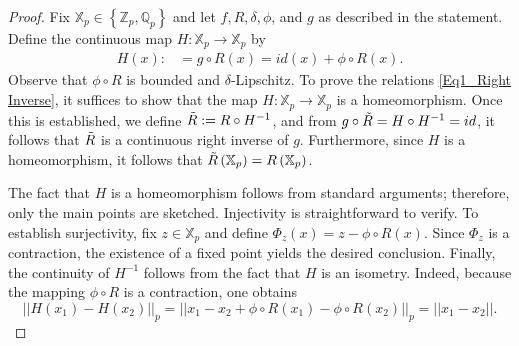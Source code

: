 \documentclass[a4paper, 12pt]{article}
\theoremstyle{definition}
\begin{document}
	
	\begin{proof} 
		Fix $\mathbb{X}_{p} \in  \left\{  \mathbb{Z}_{p}, \mathbb{Q}_{p}  \right\} $ and let $f, R, \delta, \phi$, and $g$ as described in the statement. Define the continuous map $H: \mathbb{X}_{p} \to \mathbb{X}_{p}$ by 
		\begin{align*} 
			H(x) : &=   g\circ R(x)    =   id(x) + \phi \circ R(x)   .
		\end{align*}
		Observe that $\phi\circ R$ is bounded and $\delta$-Lipschitz. To prove the relations \eqref{Eq1_Right Inverse}, it suffices to show that the map $H: \mathbb{X}_{p} \to \mathbb{X}_{p}$ is a homeomorphism. Once this is established, we define $ \Tilde{R}:=  R \circ H^{-1} $, and from  $g \circ \Tilde{R} = H \circ H^{-1} = id$, it follows that $\Tilde{R}$ is a continuous right inverse of $g$. Furthermore, since $H$ is a homeomorphism, it follows that $\Tilde{R} \left(  \mathbb{X}_{p}  \right)  = R \left(  \mathbb{X}_{p}  \right) $. 
		
		The fact that $H$ is a homeomorphism follows from standard arguments; therefore, only the main points are sketched. Injectivity is straightforward to verify. To establish surjectivity, fix $z \in \mathbb{X}_{p}$ and define $\Phi_{z}(x) = z - \phi \circ R(x)$.  Since $\Phi_{z}$ is a contraction, the existence of a fixed point yields the desired conclusion. Finally, the continuity of $H^{-1}$ follows from the fact that $H$ is an isometry. Indeed, because the mapping $\phi \circ R$ is a contraction, one obtains 
		$$  \left| \left|  H \left(  x_{1}  \right)  - H \left(  x_{2}  \right)   \right|  \right|_{p}   =    \left| \left|  x_{1} - x_{2} + \phi\circ R \left(  x_{1}  \right)  - \phi\circ R \left(  x_{2}  \right)   \right|  \right|_{p}   =    \left| \left|  x_{1} - x_{2}  \right| \right|  .$$
		
		
		

\end{proof}
\end{document}
